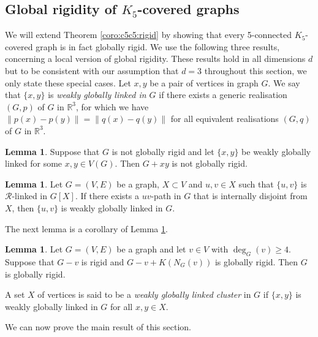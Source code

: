 \documentclass[11pt,a4paper]{article}
\theoremstyle{definition}
\newtheorem{lemma}[theorem]{Lemma}
\newcommand{\cR}{\mathcal{R}}
\newcommand{\R}{\mathbb{R}}
\begin{document}
\subsection{Global rigidity of $K_5$-covered graphs}\label{sec:globrigidK5}

We will extend Theorem \ref{coro:c5c5:rigid} by showing that every 5-connected $K_5$-covered graph is in fact globally rigid. 
We  use the following three results, concerning a local version
of global rigidity. These results hold in all dimensions $d$ but to be consistent with our assumption that $d=3$ throughout this section, we  only state these special cases.
Let $x,y$ be a pair of vertices in graph $G$.
We say that $\{x,y\}$ is {\em weakly globally linked in $G$} if
there exists a 
generic realisation $(G,p)$ of $G$ in $\R^3$, for which we have $\|p(x)-p(y)\|=\|q(x)-q(y)\|$ for all equivalent realisations $(G,q)$ of $G$ in $\R^3$.


\begin{lemma}\cite{JVwgl}
    \label{addwgl}
    Suppose that $G$
    is not globally rigid 
    and let $\{x,y\}$ be weakly globally
    linked for some $x,y\in V(G)$. Then $G+xy$ is not globally rigid.
\end{lemma}



\begin{lemma}\cite{JVwgl}\label{lem:wgl_path}
    Let $G=(V,E)$ be a graph, $X\subset V$ and $u,v\in X$ such that %
                           $\{u,v\}$ is $\cR$-linked in $G[X]$.
If there exists a $uv$-path in $G$ that is internally disjoint from $X$, then $\{u,v\}$ is weakly globally linked in $G$.
\end{lemma}

The next lemma is a corollary of Lemma \ref{lem:wgl_path}.

\begin{lemma}\cite{JVwgl,Tani}
    \label{lem:tanigawa}
    Let $G=(V,E)$ be a graph and let $v\in V$ with $\deg_G(v)\geq 4$.
    Suppose that $G-v$ is rigid and $G-v+K(N_G(v))$ is globally rigid.
    Then $G$ is globally rigid.
\end{lemma}

A set $X$ of vertices is said to be a {\it weakly globally linked cluster}
in $G$ 
if $\{x,y\}$ is weakly globally linked in $G$ 
for all $x,y\in X$.





We can now prove the main result of this section. 
\end{document}

